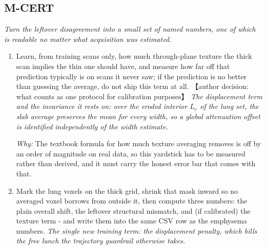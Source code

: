 \documentclass[10pt,a4paper]{article}
\begin{document}
\subsection*{M-CERT}
\emph{Turn the leftover disagreement into a small set of named numbers, one of which is readable no matter what acquisition was estimated.}
\begin{enumerate}[leftmargin=*,start=3]
  \item Learn, from training scans only, how much through-plane texture the thick scan implies the thin one should have, and measure how far off that prediction typically is on scans it never saw;\allowbreak{} if the prediction is no better than guessing the average, do not ship this term at all. 【author decision: what counts as one protocol for calibration purposes】
\noindent\emph{The displacement term and the invariance it rests on: over the eroded interior \(L_{e}\) of the lung set, the slab average preserves the mean for every width, so a global attenuation offset is identified independently of the width estimate.}
\par{}
\par\emph{Why:} The textbook formula for how much texture averaging removes is off by an order of magnitude on real data, so this yardstick has to be measured rather than derived, and it must carry the honest error bar that comes with that.
  \item Mark the lung voxels on the thick grid, shrink that mask inward so no averaged voxel borrows from outside it, then compute three numbers: the plain overall shift, the leftover structural mismatch, and (if calibrated) the texture term - and write them into the same CSV row as the emphysema numbers.
\noindent\emph{The single new training term: the displacement penalty, which bills the free lunch the trajectory guardrail otherwise takes.}
\par{}

\end{enumerate}
\end{document}
